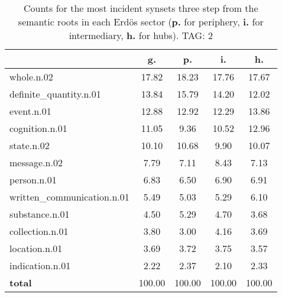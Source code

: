 \begin{table}[h!]
\begin{center}
\begin{tabular}{| l || c | c | c | c |}\hline
 & {\bf g.} & {\bf p.} & {\bf i.} & {\bf h.} \\\hline\hline
whole.n.02 & 17.82  & 18.23  & 17.76  & 17.67 \\\hline
definite\_quantity.n.01 & 13.84  & 15.79  & 14.20  & 12.02 \\\hline
event.n.01 & 12.88  & 12.92  & 12.29  & 13.86 \\\hline
cognition.n.01 & 11.05  & 9.36  & 10.52  & 12.96 \\\hline
state.n.02 & 10.10  & 10.68  & 9.90  & 10.07 \\\hline
message.n.02 & 7.79  & 7.11  & 8.43  & 7.13 \\\hline
person.n.01 & 6.83  & 6.50  & 6.90  & 6.91 \\\hline
written\_communication.n.01 & 5.49  & 5.03  & 5.29  & 6.10 \\\hline
substance.n.01 & 4.50  & 5.29  & 4.70  & 3.68 \\\hline
collection.n.01 & 3.80  & 3.00  & 4.16  & 3.69 \\\hline
location.n.01 & 3.69  & 3.72  & 3.75  & 3.57 \\\hline
indication.n.01 & 2.22  & 2.37  & 2.10  & 2.33 \\\hline\hline
{{\bf total}} & 100.00  & 100.00  & 100.00  & 100.00 \\\hline
\end{tabular}
\caption{Counts for the most incident synsets three step from the semantic roots in each Erd\"os sector ({\bf p.} for periphery, {\bf i.} for intermediary, {\bf h.} for hubs). TAG: 2}
\end{center}
\end{table}